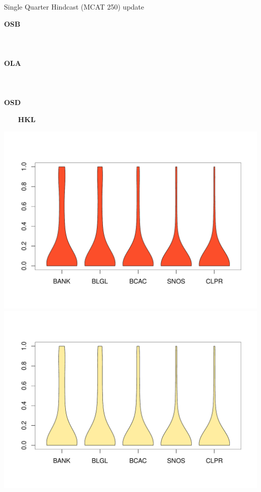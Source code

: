 \documentclass[ xcolor = pdftex, dvipsnames, table ]{beamer}
\begin{document}
\begin{frame}{Single Quarter Hindcast (MCAT 250) {\color{red} update}}
\hspace*{-1cm}
\begin{minipage}{0.09\textwidth}
\textbf{OSB}\\\\\\\\%
\textbf{OLA}\\\\\\\\%
\textbf{OSD}
\end{minipage}
\hspace*{-0.5cm}
\begin{minipage}{0.29\textwidth}
\begin{center}
$~~~~~~~~~$\textbf{HKL}
\end{center}
\vspace*{-0.75cm}
\includegraphics[height=0.36\textheight]{../pictures/vioStarOSBHKL.pdf}\\
\vspace*{-1.3cm}
\includegraphics[height=0.36\textheight]{../pictures/vioStarOLAHKL.pdf}\\

\end{minipage}
\end{frame}
\end{document}
